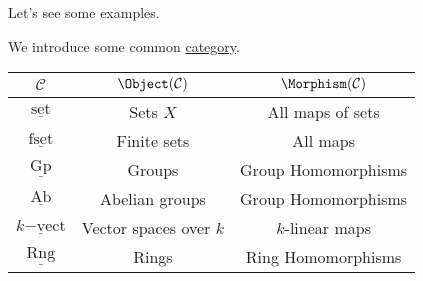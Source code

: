 Let's see some examples.
\begin{eg}
	We introduce some common \hyperref[def:category]{category}.
	\begin{table}[H]
		\centering
		\begin{tabular}{c|c|c}
			\toprule
			\(\mathcal{C} \)                  & \(\Object(\mathcal{C} )\)                                                                          & \(\Morphism (\mathcal{C} )\)                                                                                                                                  \\
			\midrule
			\(\underline{\mathrm{set}}\)      & Sets \(X\)                                                                                         & All maps of sets                                                                                                                                              \\
			\(\underline{\mathrm{fset}}\)     & Finite sets                                                                                        & All maps                                                                                                                                                      \\
			\(\underline{\mathrm{Gp}}\)       & Groups                                                                                             & Group Homomorphisms                                                                                                                                           \\
			\(\underline{\mathrm{Ab}}\)       & Abelian groups                                                                                     & Group Homomorphisms                                                                                                                                           \\
			\(\underline{k\mathrm{-vect}}\)   & Vector spaces over \(k\)                                                                           & \(k\)-linear maps                                                                                                                                             \\
			\(\underline{\mathrm{Rng}}\)      & Rings                                                                                              & Ring Homomorphisms                                                                                                                                            \\

\end{tabular}
\end{table}
\end{eg}
